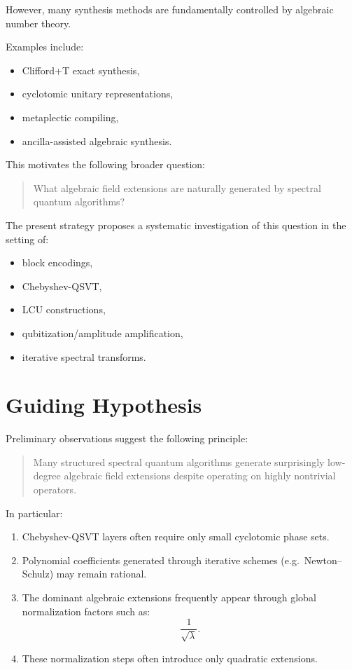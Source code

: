 \documentclass[12pt,a4paper]{article}
\begin{document}
However, many synthesis methods are fundamentally controlled by algebraic number theory.

Examples include:

\begin{itemize}
    \item Clifford+T exact synthesis,
    \item cyclotomic unitary representations,
    \item metaplectic compiling,
    \item ancilla-assisted algebraic synthesis.
\end{itemize}

This motivates the following broader question:

\begin{quote}
What algebraic field extensions are naturally generated by spectral quantum algorithms?
\end{quote}

The present strategy proposes a systematic investigation of this question in the setting of:

\begin{itemize}
    \item block encodings,
    \item Chebyshev-QSVT,
    \item LCU constructions,
    \item qubitization/amplitude amplification,
    \item iterative spectral transforms.
\end{itemize}


\section{Guiding Hypothesis}

Preliminary observations suggest the following principle:

\begin{quote}
Many structured spectral quantum algorithms generate surprisingly low-degree algebraic field extensions despite operating on highly nontrivial operators.
\end{quote}

In particular:

\begin{enumerate}
    \item Chebyshev-QSVT layers often require only small cyclotomic phase sets.
    
    \item Polynomial coefficients generated through iterative schemes (e.g.\ Newton--Schulz) may remain rational.
    
    \item The dominant algebraic extensions frequently appear through global normalization factors such as:
    \[
    \frac1{\sqrt{\lambda}}.
    \]
    
    \item These normalization steps often introduce only quadratic extensions.
\end{enumerate}
\end{document}
